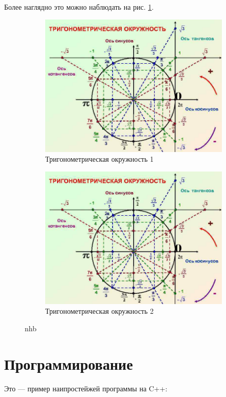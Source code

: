\documentclass[120.214pt]{article}%
\begin{document}
Более наглядно это можно наблюдать на рис. \ref{pic_trig1}.

\begin{figure}[h!]
	\begin{subfigure}{.5\linewidth}
		\centering
		\includegraphics[width=0.7\linewidth]{photo/trigcirc}
		\caption{Тригонометрическая окружность 1}
		\label{pic_trig1}
	\end{subfigure}
	\begin{subfigure}{.5\linewidth}
		\centering
		\includegraphics[width=0.7\linewidth]{photo/trigcirc}
		\caption{Тригонометрическая окружность 2}
		\label{pic_trig2}
	\end{subfigure}
\caption{nhb}
\end{figure}

\newpage

\section{Программирование}

Это --- пример наипростейжей программы на C++:

%
\end{document}
